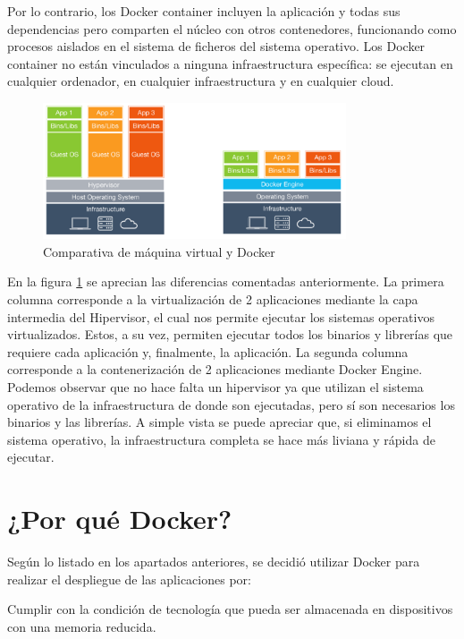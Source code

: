 Por lo contrario, los Docker container incluyen la aplicación y todas sus dependencias pero comparten el núcleo con otros contenedores, funcionando como procesos aislados en el sistema de ficheros del sistema operativo. Los Docker container no están vinculados a ninguna infraestructura específica: se ejecutan en cualquier ordenador, en cualquier infraestructura y en cualquier cloud.

\begin{figure}[htb]
\begin{center}
\includegraphics[width=0.8\textwidth]{./setup/VrvsDocker}
\caption{Comparativa de máquina virtual y Docker}
\label{Vs:VrvsDocker}
\end{center}
\end{figure}

En la figura \ref{Vs:VrvsDocker} se aprecian las diferencias comentadas anteriormente. La primera columna corresponde a la virtualización de 2 aplicaciones mediante la capa
intermedia del Hipervisor, el cual nos permite ejecutar los sistemas operativos virtualizados. Estos, a su vez, permiten ejecutar todos los binarios y librerías que requiere cada aplicación y, finalmente, la aplicación. La segunda columna corresponde a la contenerización de 2 aplicaciones mediante Docker Engine. Podemos observar
que no hace falta un hipervisor ya que utilizan el sistema operativo de la infraestructura
de donde son ejecutadas, pero sí son necesarios los binarios y las librerías. A simple vista se puede apreciar que, si eliminamos el sistema operativo, la infraestructura completa se hace más liviana y rápida de ejecutar.

\section{¿Por qué Docker?}\label{PqD:PQDocker}

Según lo listado en los apartados anteriores, se decidió utilizar Docker para realizar el despliegue de las aplicaciones por:

Cumplir con la condición de tecnología que pueda ser almacenada en dispositivos con una memoria reducida.

